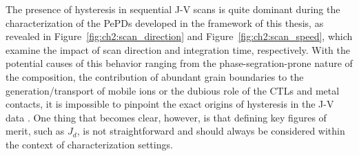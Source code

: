 The presence of hysteresis in sequential J-V scans is quite dominant during the characterization of the PePDs developed in the framework of this thesis, as revealed in Figure~\ref{fig:ch2:scan_direction} and Figure~\ref{fig:ch2:scan_speed}, which examine the impact of scan direction and integration time, respectively. With the potential causes of this behavior ranging from the phase-segration-prone nature of the  composition, the contribution of abundant grain boundaries to the generation/transport of mobile ions or the dubious role of the CTLs and metal contacts, it is impossible to pinpoint the exact origins of hysteresis in the J-V data \cite{Ghasemi2023APerovskites, Shao2016GrainFilms, Yun2016CriticalCells, Meggiolaro2019FormationPerovskites, Aristidou2017FastCells, Barker2017Defect-AssistedFilms,Li2018InorganicCells,Ighodalo2023NegligiblePerovskites}. One thing that becomes clear, however, is that defining key figures of merit, such as $J_d$, is not straightforward and should always be considered within the context of characterization settings.

